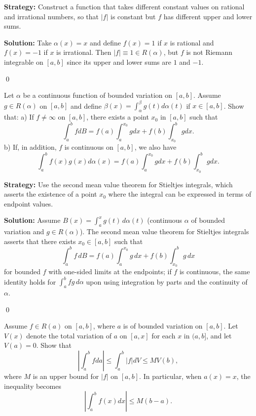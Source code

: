 \noindent\textbf{Strategy:} Construct a function that takes different constant values on rational and irrational numbers, so that $|f|$ is constant but $f$ has different upper and lower sums.

\bigskip\noindent\textbf{Solution:}
Take $\alpha(x)=x$ and define $f(x)=1$ if $x$ is rational and $f(x)=-1$ if $x$ is irrational. Then $|f|\equiv 1\in R(\alpha)$, but $f$ is not Riemann integrable on $[a,b]$ since its upper and lower sums are $1$ and $-1$.




\qed
\begin{problembox}
\begin{problemstatement}
Let $\alpha$ be a continuous function of bounded variation on $[a, b]$. Assume $g \in R(\alpha)$ on $[a, b]$ and define $\beta(x) = \int_{\alpha}^{\beta} g(t) d\alpha(t)$ if $x \in [a, b]$. Show that:
a) If $f \neq \infty$ on $[a, b]$, there exists a point $x_0$ in $[a, b]$ such that
\[\int_{a}^{b} f dB = f(a) \int_{a}^{x_0} g dx + f(b) \int_{x_0}^{b} g dx.\]
b) If, in addition, $f$ is continuous on $[a, b]$, we also have
\[\int_{a}^{b} f(x)g(x) d\alpha(x) = f(a) \int_{a}^{x_0} g dx + f(b) \int_{x_0}^{b} g dx.\]
\end{problemstatement}
\end{problembox}

\noindent\textbf{Strategy:} Use the second mean value theorem for Stieltjes integrals, which asserts the existence of a point $x_0$ where the integral can be expressed in terms of endpoint values.

\bigskip\noindent\textbf{Solution:}
Assume $B(x)=\int_a^x g(t)\,d\alpha(t)$ (continuous $\alpha$ of bounded variation and $g\in R(\alpha)$). The second mean value theorem for Stieltjes integrals asserts that there exists $x_0\in[a,b]$ such that
\[\int_a^b f\,dB = f(a)\int_a^{x_0} g\,dx + f(b)\int_{x_0}^b g\,dx\]
for bounded $f$ with one-sided limits at the endpoints; if $f$ is continuous, the same identity holds for $\int_a^b f g\,d\alpha$ upon using integration by parts and the continuity of $\alpha$.




\qed
\begin{problembox}
\begin{problemstatement}
Assume $f \in R(a)$ on $[a, b]$, where $a$ is of bounded variation on $[a, b]$. Let $V(x)$ denote the total variation of $a$ on $[a, x]$ for each $x$ in $(a, b]$, and let $V(a) = 0$. Show that
\[\left| \int_a^b f da \right| \leq \int_a^b |f| dV \leq MV(b),\]
where $M$ is an upper bound for $|f|$ on $[a, b]$. In particular, when $a(x) = x$, the inequality becomes
\[\left| \int_a^b f(x) dx \right| \leq M(b - a).\]
\end{problemstatement}
\end{problembox}

